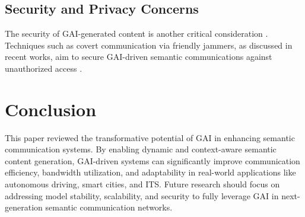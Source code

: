 \documentclass[journal]{IEEEtran}
\begin{document}
\subsection{Security and Privacy Concerns}
The security of GAI-generated content is another critical consideration \cite{10447237}. Techniques such as covert communication via friendly jammers, as discussed in recent works, aim to secure GAI-driven semantic communications against unauthorized access \cite{9797984}.

\section{Conclusion}
This paper reviewed the transformative potential of GAI in enhancing semantic communication systems. By enabling dynamic and context-aware semantic content generation, GAI-driven systems can significantly improve communication efficiency, bandwidth utilization, and adaptability in real-world applications like autonomous driving, smart cities, and ITS. Future research should focus on addressing model stability, scalability, and security to fully leverage GAI in next-generation semantic communication networks.



\end{document}
